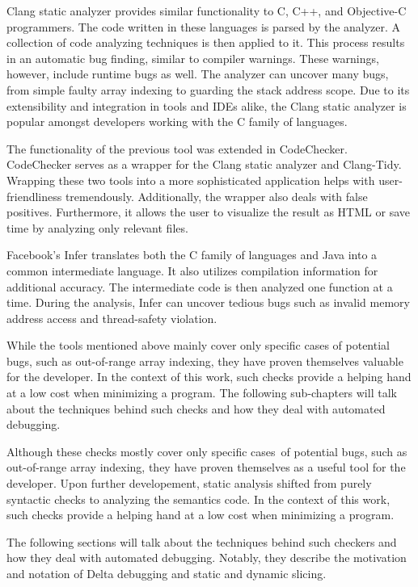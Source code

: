Clang static analyzer provides similar functionality to C, C++, and 
Objective-C programmers.
The code written in these languages is parsed by the analyzer.
A collection of code analyzing techniques is then applied to it.
This process results in an automatic bug finding, similar to compiler 
warnings.
These warnings, however, include runtime bugs as well.
The analyzer can uncover many bugs, from simple faulty array 
indexing to guarding the stack address scope.
Due to its extensibility and integration in tools and IDEs alike, 
the Clang static analyzer is popular amongst developers working 
with the C family of languages.

The functionality of the previous tool was extended in CodeChecker.
Code\-Check\-er serves as a wrapper for the Clang static analyzer and 
Clang-Tidy.
Wrapping these two tools into a more sophisticated application helps 
with user-friend\-li\-ness tremendously.
Additionally, the wrapper also deals with false positives.
Furthermore, it allows the user to visualize the result as HTML or 
save time by analyzing only relevant files.

Facebook's Infer translates both the C family of languages and Java 
into a common intermediate language.
It also utilizes compilation information for additional accuracy.
The intermediate code is then analyzed one function at a time.
During the analysis, Infer can uncover tedious bugs such as invalid 
memory address access and thread-safety violation.

While the tools mentioned above mainly cover only specific cases 
of potential bugs, such as out-of-range array indexing, they 
have proven themselves valuable for the developer.
In the context of this work, such checks provide a helping hand 
at a low cost when minimizing a program.
The following sub-chapters will talk about the techniques behind 
such checks and how they deal with automated debugging.

Although these checks mostly cover only specific 
cases~of potential bugs, such as out-of-range array indexing, they have proven 
themselves as a useful tool for the developer.
Upon further developement, static analysis shifted from purely syntactic
checks to analyzing the semantics code.
In the context of this work, such checks provide a helping hand 
at a low cost when minimizing a program. 

The following sections will talk about the techniques behind such checkers 
and how they deal with automated debugging. Notably, they describe
the motivation and notation of Delta debugging and static and dynamic
slicing.

